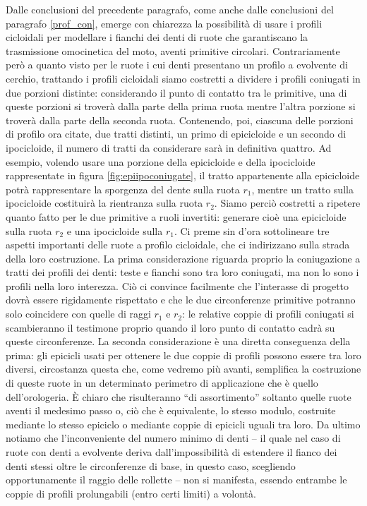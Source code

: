 \noindent Dalle conclusioni del precedente paragrafo, come anche dalle
conclusioni del paragrafo \ref{prof_con}, emerge con chiarezza la possibilit\`a
di usare i profili cicloidali per modellare i fianchi dei denti di ruote
che garantiscano la trasmissione omocinetica del moto, 
aventi primitive circolari. Contrariamente 
per\`o a quanto visto per le ruote i cui denti presentano un
profilo a evolvente di cerchio,
trattando i profili cicloidali siamo costretti a dividere i profili coniugati
in due porzioni distinte: considerando il punto di contatto tra le
primitive, una di queste porzioni si trover\`a 
dalla parte della prima ruota mentre l'altra porzione si trover\`a
dalla parte della seconda ruota. Contenendo, poi, ciascuna delle porzioni
di profilo ora citate, due tratti distinti, un primo di epicicloide
e un secondo di ipocicloide,
il numero di tratti da considerare sar\`a in definitiva quattro.
Ad esempio, volendo
usare una porzione della epicicloide e della ipocicloide rappresentate in
 figura \ref{fig:epiipoconiugate}, il tratto appartenente alla epicicloide
potr\`a rappresentare la sporgenza del dente sulla ruota $r_1$, 
 mentre un tratto sulla ipocicloide
costituir\`a la rientranza sulla ruota $r_2$.
Siamo perci\`o costretti a 
ripetere quanto fatto per le due primitive a ruoli invertiti: generare cio\`e
una epicicloide sulla ruota $r_2$
e una ipocicloide sulla $r_1$. Ci preme sin d'ora sottolineare
tre aspetti importanti delle ruote a profilo cicloidale,
che ci indirizzano sulla strada della loro costruzione.
La prima considerazione riguarda proprio la coniugazione
a tratti dei profili dei denti:
teste e fianchi sono tra loro coniugati, ma non lo sono i profili
nella loro interezza.
Ci\`o ci convince facilmente che l'interasse di progetto
dovr\`a essere rigidamente rispettato e che le due circonferenze primitive
potranno solo coincidere con quelle di raggi
$r_1$ e $r_2$: le relative coppie di profili coniugati si scambieranno
il testimone proprio quando il loro punto di contatto cadr\`a su queste
circonferenze.
La seconda considerazione \`e una diretta conseguenza della
prima: gli epicicli usati per ottenere le due coppie di profili possono essere
tra loro diversi, circostanza questa
che, come vedremo pi\`u avanti, semplifica la
 costruzione di queste ruote in un determinato perimetro di applicazione che
\`e quello dell'orologeria.
\`E chiaro che risulteranno ``di assortimento'' soltanto quelle ruote
aventi il medesimo passo o, ci\`o che \`e equivalente, lo stesso modulo, 
costruite mediante lo stesso epiciclo o mediante coppie di epicicli uguali
tra loro.
Da ultimo notiamo che l'inconveniente del numero minimo di
denti -- il quale
nel caso di ruote con denti a evolvente deriva dall'impossibilit\`a
di
estendere il fianco dei denti stessi oltre le circonferenze di base,
in questo caso, scegliendo opportunamente il raggio delle rollette --
non si manifesta, essendo entrambe le coppie di profili
prolungabili (entro certi limiti) a volont\`a.

